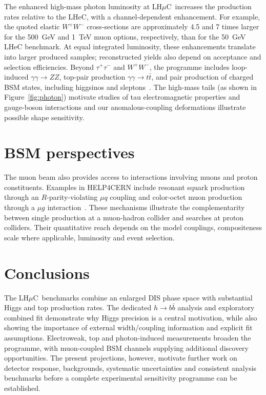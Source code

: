 \documentclass[a4paper,11pt]{article}
\newcommand{\lhmuc}{LH$\mu$C}
\begin{document}
The enhanced high-mass photon luminosity at \lhmuc\
increases the production rates relative to the LHeC,
with a channel-dependent enhancement. For example,
the quoted elastic $W^+W^-$ cross-sections are approximately
4.5 and 7 times larger for the 500~GeV and 1~TeV muon
options, respectively, than for the 50~GeV LHeC benchmark.
At equal integrated luminosity, these enhancements translate
into larger produced samples; reconstructed yields also
depend on acceptance and selection efficiencies. 
Beyond $\tau^+\tau^-$ and $W^+W^-$, the programme includes
loop-induced $\gamma\gamma\to ZZ$, top-pair production
$\gamma\gamma\to t\bar t$, and pair production of charged
BSM states, including higgsinos and
sleptons~\cite{HELP4CERN,Khanpour:DIS2026}.  
The high-mass tails (as shown in Figure~\ref{fig:photon}) motivate studies of tau 
electromagnetic properties and gauge-boson interactions and 
our anomalous-coupling deformations 
illustrate possible shape sensitivity.  



\section{BSM perspectives}\label{sec:BSM}


The muon beam also provides access to interactions involving muons and proton constituents. 
Examples in HELP4CERN include resonant squark production 
through an $R$-parity-violating $\mu q$ coupling and 
color-octet muon production through a $\mu g$ interaction~\cite{HELP4CERN,Cheung:2021iev}. 
These mechanisms illustrate the complementarity between 
single production at a muon-hadron collider and 
searches at proton colliders. Their quantitative reach depends on the model couplings, 
compositeness scale where applicable, luminosity and event selection. 




\section{Conclusions}\label{sec:outlook}


The \lhmuc\ benchmarks combine an enlarged DIS phase space with 
substantial Higgs and top production rates. 
The dedicated $h\to b\bar b$ analysis and exploratory combined fit 
demonstrate why Higgs precision is a 
central motivation, while also showing the importance of external 
width/coupling information and explicit fit assumptions. 
Electroweak, top and photon-induced measurements broaden the programme, 
with muon-coupled BSM channels 
supplying additional discovery opportunities. 
The present projections, however, motivate further work on detector response, 
backgrounds, systematic uncertainties and consistent analysis 
benchmarks before a 
complete experimental sensitivity programme can be established.


\end{document}

